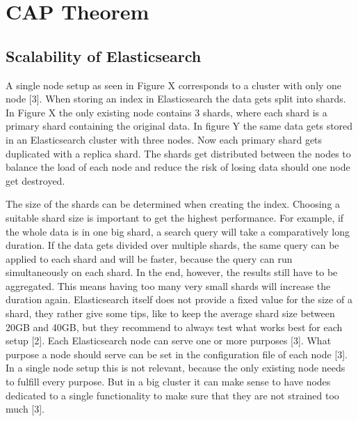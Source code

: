 \chapter{CAP Theorem}

\section{Scalability of Elasticsearch}
A single node setup as seen in Figure X corresponds to a cluster with only one node [3].
When storing an index in Elasticsearch the data gets split into shards. In Figure X the only existing node contains 3 shards, where each shard is a primary shard containing the original data. In figure Y the same data gets stored in an Elasticsearch cluster with three nodes. Now each primary shard gets duplicated with a replica shard. The shards get distributed between the nodes to balance the load of each node and reduce the risk of losing data should one node get destroyed.


The size of the shards can be determined when creating the index. Choosing a suitable shard size is important to get the highest performance. For example, if the whole data is in one big shard, a search query will take a comparatively long duration. If the data gets divided over multiple shards, the same query can be applied to each shard and will be faster, because the query can run simultaneously on each shard. In the end, however, the results still have to be aggregated. This means having too many very small shards will increase the duration again. Elasticsearch itself does not provide a fixed value for the size of a shard, they rather give some tips, like to keep the average shard size between 20GB and 40GB, but they recommend to always test what works best for each setup [2].
Each Elasticsearch node can serve one or more purposes [3]. What purpose a node should serve can be set in the configuration file of each node [3]. In a single node setup this is not relevant, because the only existing node needs to fulfill every purpose. But in a big cluster it can make sense to have nodes dedicated to a single functionality to make sure that they are not strained too much [3].

